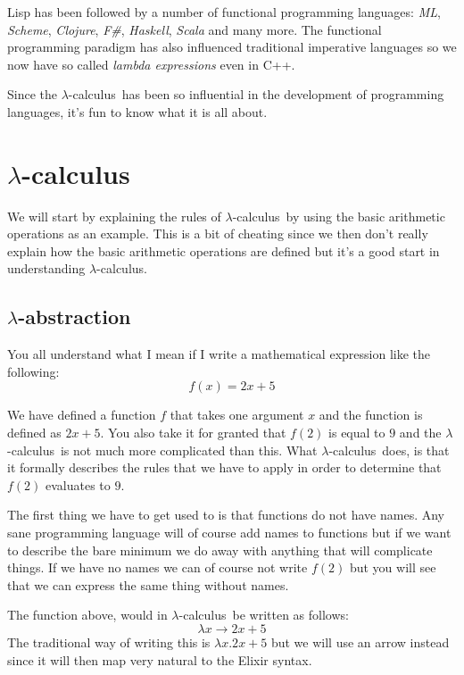 \documentclass[a4paper,11pt]{article}
\newcommand{\lamc}[0]{$\lambda$-calculus}
\newcommand{\lama}[0]{$\lambda$-abstraction}
\begin{document}
Lisp has been followed by a number of functional
programming languages: {\em ML}, {\em Scheme}, {\em Clojure}, {\em
  F\#}, {\em Haskell}, {\em Scala} and many more. The functional
programming paradigm has also influenced traditional imperative
languages so we now have so called {\em lambda expressions} even in C++.

Since the \lamc\ has been so influential in the development of
programming languages, it's fun to know what it is all about. 



\section{\lamc}

We will start by explaining the rules of \lamc\ by using the basic
arithmetic operations as an example. This is a bit of cheating since we
then don't really explain how the basic arithmetic operations are
defined but it's a good start in understanding \lamc.


\subsection{\lama}

You all understand what I mean if I write a mathematical expression
like the following:$$f(x) = 2x + 5$$

We have defined a function $f$ that takes one argument $x$ and the
function is defined as $2x + 5$. You also take it for granted that
$f(2)$ is equal to $9$ and the \lamc\ is not much more complicated
than this. What \lamc\ does, is that it formally describes the rules
that we have to apply in order to determine that $f(2)$ evaluates to
$9$.

The first thing we have to get used to is that functions do not have
names. Any sane programming language will of course add names to
functions but if we want to describe the bare minimum we do away with
anything that will complicate things. If we have no names we can of
course not write $f(2)$ but you will see that we can express the same
thing without names.

The function above, would in \lamc\ be written as
follows:$$\lambda x \rightarrow 2x + 5$$The traditional way of writing
this is $\lambda x.2x+5$ but we will use an arrow instead since it
will then map very natural to the Elixir syntax.
\end{document}

